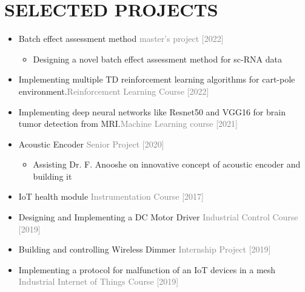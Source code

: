 \documentclass[10pt,a4paper,sans]{moderncv} %
\begin{document}
	\section{SELECTED PROJECTS}
	\begin{itemize}
		\item Batch effect assessment method \hfill \textcolor{gray}{master's project [2022]}
		\begin{itemize}
		\item Designing a novel batch effect assessment method for sc-RNA data
		\end{itemize}
		\item Implementing multiple TD reinforcement learning algorithms for cart-pole environment.\hfill \textcolor{gray}{Reinforcement Learning Course [2022]}
		\item Implementing deep neural networks like Resnet50 and VGG16 for brain tumor detection from MRI.\hfill \textcolor{gray}{Machine Learning course [2021]}
		\item Acoustic Encoder \hfill \textcolor{gray}{Senior Project [2020]} 
		\begin{itemize}
		\item Assisting Dr. F. Anooshe on innovative concept of acoustic encoder and building it
		\end{itemize}
		\item IoT health module \hfill \textcolor{gray}{Instrumentation Course [2017]}
		\item Designing and Implementing a DC Motor Driver \hfill \textcolor{gray}{Industrial Control Course [2019]}
		\item Building and controlling Wireless Dimmer \hfill \textcolor{gray}{Internship Project [2019]}
		\item Implementing a protocol for malfunction of an IoT devices in a mesh \hfill \textcolor{gray}{Industrial Internet of Things Course [2019]}
		\end{itemize}
\end{document}
